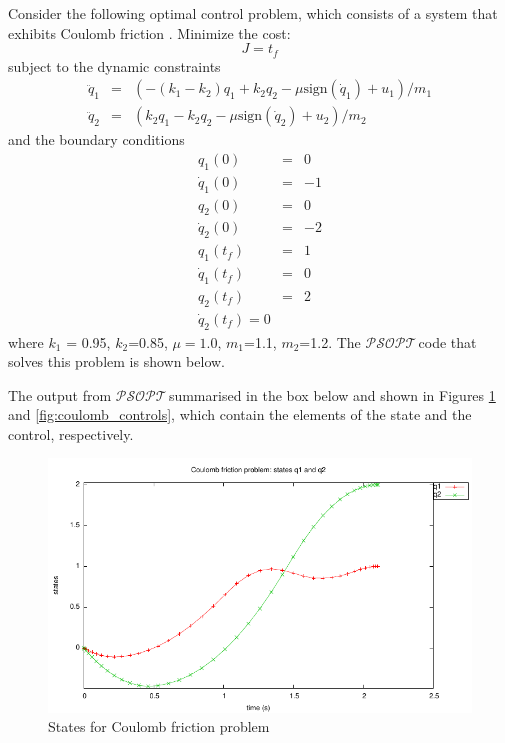 \documentclass[a4paper,11pt]{report}    %
\newcommand{\psopt}{$\mathcal{PSOPT}$\,}  %
\newenvironment{shadedframe}{%
  \def\FrameCommand{\fcolorbox{black}{shadecolor}}%
  \MakeFramed {\FrameRestore}}
{\endMakeFramed}
\begin{document}
Consider the following optimal control problem, which consists of a system that exhibits Coulomb
friction  \cite{Luus:02}.  Minimize the cost:
\begin{equation}
  J = t_f
\end{equation}
subject to the dynamic constraints
\begin{equation}
  \begin{array}{lcl}
    \ddot  q_1 & = & ( -(k_1-k_2)q_1 + k_2 q_2 -\mu \mathrm{sign}( \dot q_1 ) + u_1)/m_1 \\
    \ddot  q_2 & = & ( k_2q_1 - k_2 q_2 -\mu \mathrm{sign}( \dot q_2 ) + u_2)/m_2
  \end{array}
\end{equation}
and the boundary conditions
\begin{equation}
  \begin{array}{lcl}
    q_1(0) & = & 0 \\
    \dot q_1(0) & = & -1 \\
    q_2(0) & = & 0 \\
    \dot q_2(0) & = & -2 \\
    q_1(t_f) & = & 1 \\
   \dot q_1(t_f) & = & 0 \\
   q_2(t_f)  & = & 2 \\
   \dot q_2(t_f) = 0 
  \end{array}
\end{equation}
where $k_1$ = 0.95, $k_2$=0.85, $\mu=1.0$, $m_1$=1.1, $m_2$=1.2. The
\psopt code that solves this problem is shown below.  

\tiny
\begin{shadedframe}

\end{shadedframe}
\normalsize

The output from \psopt summarised in the box below and shown in Figures \ref{fig:coulomb_states} and \ref{fig:coulomb_controls}, which contain the elements
of the state and the control, respectively.

\begin{shadedframe}

\end{shadedframe}

\begin{figure}
  \centering 
  \includegraphics{../examples/coulomb/coulomb_states}
  \caption{States for Coulomb friction problem}
 \label{fig:coulomb_states}
\end{figure}
\end{document}
